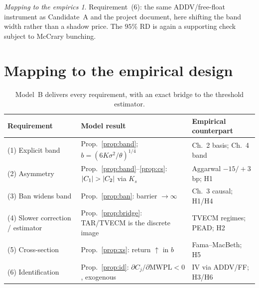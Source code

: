 \documentclass[11pt,a4paper]{article}
\DeclarePairedDelimiter{\abs}{\lvert}{\rvert}
\theoremstyle{plain}
\theoremstyle{definition}
\theoremstyle{remark}
\newtheorem*{takeaway}{Mapping to the empirics}
\begin{document}
\begin{takeaway}
Requirement~(6): the same ADDV/free-float instrument as Candidate~A and the project document, here shifting the band width rather than a shadow price. The $95\%$ RD is again a supporting check subject to McCrary bunching.
\end{takeaway}

\section{Mapping to the empirical design}\label{sec:map}
\begin{table}[h]\centering\small\renewcommand{\arraystretch}{1.25}
\begin{tabular}{@{}p{} p{} p{}@{}}
\toprule
\textbf{Requirement} & \textbf{Model result} & \textbf{Empirical counterpart} \\
\midrule
(1) Explicit band & Prop.~\ref{prop:band}; $b=(6K\sigma^2/\theta)^{1/4}$ & Ch.~2 basis; Ch.~4 band \\
(2) Asymmetry & Prop.~\ref{prop:band}--\ref{prop:cs}: $\abs{C_1}>\abs{C_2}$ via $K_s$ & Aggarwal $-15/+3$ bp; H1 \\
(3) Ban widens band & Prop.~\ref{prop:ban}: barrier $\to\infty$ & Ch.~3 causal; H1/H4 \\
(4) Slower correction / estimator & Prop.~\ref{prop:bridge}: TAR/TVECM is the discrete image & TVECM regimes; PEAD; H2 \\
(5) Cross-section & Prop.~\ref{prop:xs}: return $\uparrow$ in $b$ & Fama--MacBeth; H5 \\
(6) Identification & Prop.~\ref{prop:id}: $\partial C_j/\partial\mathrm{MWPL}<0$, exogenous & IV via ADDV/FF; H3/H6 \\
\bottomrule
\end{tabular}
\caption{Model~B delivers every requirement, with an exact bridge to the threshold estimator.}
\label{tab:mapB}
\end{table}
\end{document}
